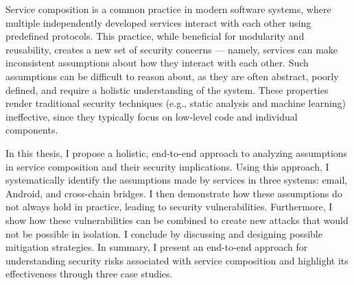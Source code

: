 
\begin{dissertationabstract} 
Service composition is a common practice in modern software systems, where multiple independently developed services interact with each other using predefined protocols. This practice, while beneficial for modularity and reusability, creates a new set of security concerns --- namely, services can make inconsistent assumptions about how they interact with each other. Such assumptions can be difficult to reason about, as they are often abstract, poorly defined, and require a holistic understanding of the system. These properties render traditional security techniques (e.g., static analysis and machine learning) ineffective, since they typically focus on low-level code and individual components.

In this thesis, I propose a holistic, end-to-end approach to analyzing assumptions in service composition and their security implications. Using this approach, I systematically identify the assumptions made by services in three systems: email, Android, and cross-chain bridges. I then demonstrate how these assumptions do not always hold in practice, leading to security vulnerabilities. Furthermore, I show how these vulnerabilities can be combined to create new attacks that would not be possible in isolation. I conclude by discussing and designing possible mitigation strategies. In summary, I present an end-to-end approach for understanding security risks associated with service composition and highlight its effectiveness through three case studies.


\end{dissertationabstract}